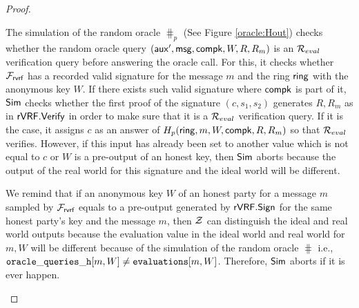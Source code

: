 \begin{proof}
\begin{itemize}
		The simulation of the random oracle $ \hash_p $ (See Figure \ref{oracle:Hout}) checks whether the random oracle query $ (\mathsf{aux}', \mathsf{msg},\mathsf{compk},W,R,R_m)  $ is an $ \mathcal{R}_{eval} $ verification query before answering the oracle call. For this, it checks whether $ \mathcal{F}_{\textsf{rvrf}} $ has a recorded valid signature for the message $ m $ and the ring $ \mathsf{ring} $ with the anonymous key $ W $. If there exists such valid signature where $ \mathsf{compk} $ is part of it, $ \mathsf{Sim} $ checks whether the first proof of the signature $ (c,s_1, s_2) $ generates $ R, R_m $ as in $ {\mathsf{rVRF}}.{\mathsf{Verify}} $ in order to make sure that it is a $ \mathcal{R}_{eval} $ verification query. If it is the case, it assigns $ c $ as an answer of $ H_p (\mathsf{ring},m,W,\mathsf{compk},R,R_m) $ so that $ \mathcal{R}_{eval} $ verifies. However, if this input has already been set to another value which is not equal to $ c $ or $ W $ is a pre-output of an honest key, then $ \mathsf{Sim} $ aborts because the output of the real world for this signature and the ideal world will be different.

		We remind that if an anonymous key $ W $ of an honest party  for a message $ m $ sampled by $ \mathcal{F}_{\textsf{rvrf}} $ equals to a pre-output generated by $ {\mathsf{rVRF}}.{\mathsf{Sign}} $  for the same honest party's key and the message $ m $, then $ \mathcal{Z} $ can distinguish the ideal and real world outputs because the evaluation value in the ideal world and real world for $ m,W $ will be different because of the simulation of the random oracle $ \hash $ i.e., $ \mathtt{oracle\_queries\_h}[m,W] \neq \texttt{evaluations}[m,W] $.  Therefore, $ \mathsf{Sim} $ aborts if it is ever happen.
		
		\begin{figure}
			\centering
			
			\noindent{}
\end{figure}
\end{itemize}
\end{proof}

